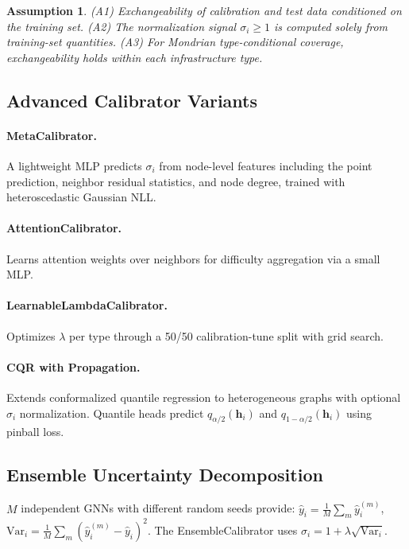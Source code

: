 \documentclass[twoside,11pt]{article}
\newtheorem{assumption}{Assumption}
\begin{document}
\begin{assumption}
(A1) Exchangeability of calibration and test data conditioned on the training
set. (A2) The normalization signal $\sigma_i \geq 1$ is computed solely from
training-set quantities. (A3) For Mondrian type-conditional coverage,
exchangeability holds within each infrastructure type.
\end{assumption}

\subsection{Advanced Calibrator Variants}

\paragraph{MetaCalibrator.} A lightweight MLP predicts $\sigma_i$ from
node-level features including the point prediction, neighbor residual
statistics, and node degree, trained with heteroscedastic Gaussian NLL.

\paragraph{AttentionCalibrator.} Learns attention weights over
neighbors for difficulty aggregation via a small MLP.

\paragraph{LearnableLambdaCalibrator.} Optimizes $\lambda$ per type through a
50/50 calibration-tune split with grid search.

\paragraph{CQR with Propagation.} Extends conformalized quantile regression
\citep{romano2019conformalized} to heterogeneous graphs with optional
$\sigma_i$ normalization. Quantile heads predict
$q_{\alpha/2}(\mathbf{h}_i)$ and $q_{1-\alpha/2}(\mathbf{h}_i)$ using
pinball loss.

\subsection{Ensemble Uncertainty Decomposition}

$M$ independent GNNs with different random seeds provide:
$\hat{y}_i = \frac{1}{M}\sum_m \hat{y}_i^{(m)}$,
$\text{Var}_i = \frac{1}{M}\sum_m (\hat{y}_i^{(m)} - \hat{y}_i)^2$.
The EnsembleCalibrator uses $\sigma_i = 1 + \lambda \sqrt{\text{Var}_i}$.
\end{document}
